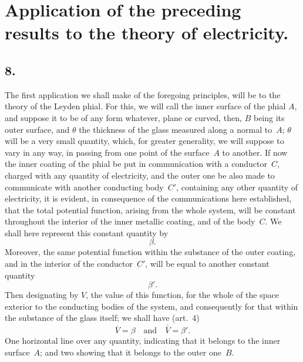 \documentclass[12pt,notitlepage]{amsart}
\newcommand\Section[1]{\subsection{{#1}}}
\begin{document}
\section{Application of the preceding results to the theory of electricity.}
\Section{8.}
The first application we shall make of the foregoing principles, will
be to the theory of the Leyden phial. For this, we will call the inner surface
of the phial $A$, and suppose it to be of any form whatever, plane or curved,
then, $B$ being its outer surface, and $\theta$
the thickness of the glass measured
along a normal to~$A$; $\theta$ will be a
very small quantity, which, for greater
generality, we will suppose to vary in any way, in passing from one point
of the surface~$A$ to another. If now the inner coating of the phial be put
in communication with a conductor~$C$, charged with any quantity of electricity,
and the outer one be also made to communicate with another
conducting body~$C'$,
containing any other quantity of electricity,
it is evident, in consequence of the
communications here established, that the total potential function, arising from
the whole system, will be constant throughout the interior of the inner metallic
coating, and of the body~$C$.
We shall here represent this constant quantity by
\[
\beta.
\]
Moreover, the same potential function within the substance of the outer coating,
and in the interior of the conductor~$C'$,
will be equal to another constant quantity
\[
\beta'.
\]
Then designating by $V$, the value of this function, for the whole of the space
exterior to the conducting bodies of the system, and consequently for that
within the substance of the glass itself; we shall have (art.~4)
\[
\overline{V}=\beta
\quad\text{and}\quad
\overline{\overline{V}}=\beta'.
\]
One horizontal line over any quantity, indicating that it belongs to the inner
surface~$A$; and two showing that it belongs to the outer one~$B$.
\end{document}
